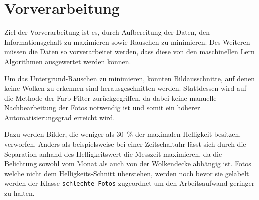 \section{Vorverarbeitung}
\label{sec:03_Preprocessing}
Ziel der Vorverarbeitung ist es, durch Aufbereitung der Daten, den
Informationsgehalt zu maximieren sowie Rauschen zu minimieren.
Des Weiteren müssen die Daten so vorverarbeitet werden, dass diese 
von den maschinellen Lern Algorithmen ausgewertet werden können. 

Um das Untergrund-Rauschen zu minimieren, könnten Bildausschnitte, auf 
denen keine Wolken zu erkennen sind herausgeschnitten werden.
Stattdessen wird auf die Methode der Farb-Filter zurückgegriffen, da dabei 
keine manuelle Nachbearbeitung der Fotos notwendig ist und somit ein höherer 
Automatisierungsgrad erreicht wird.

Dazu werden Bilder, die weniger als \SI{30}{\percent} der maximalen Helligkeit 
besitzen, verworfen. 
Anders als beispielsweise bei einer Zeitschaltuhr lässt sich durch die
Separation anhand des Helligkeitswert die Messzeit maximieren, da die 
Belichtung sowohl vom Monat als auch von der Wolkendecke abhängig ist.
Fotos welche nicht dem Helligkeits-Schnitt überstehen, werden noch bevor 
sie gelabelt werden der Klasse \texttt{schlechte Fotos} zugeordnet um 
den Arbeitsaufwand geringer zu halten.

